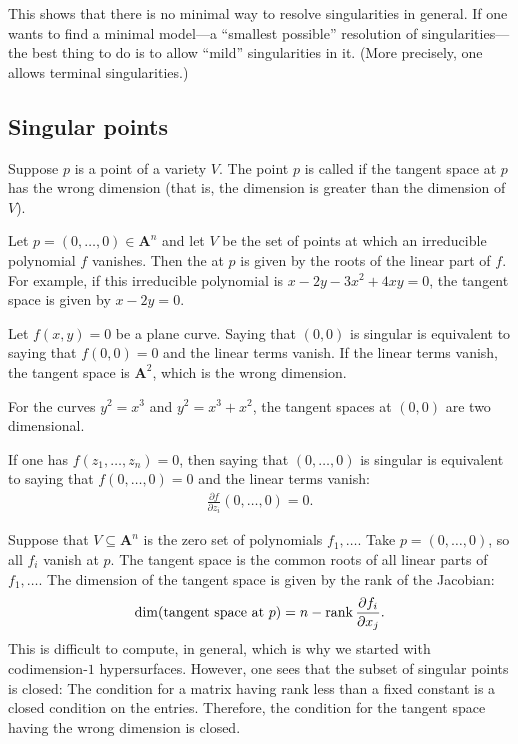 \documentclass [11 pt, oneside] {article}
\begin{document}
	This shows that there is no minimal way to resolve singularities in general. If one wants to find a minimal model---a ``smallest possible'' resolution of singularities---the best thing to do is to allow ``mild'' singularities in it. (More precisely, one allows terminal singularities.)

\subsection{Singular points}
Suppose $p$ is a point of a variety $V$. The point $p$ is called  if the tangent space at $p$ has the wrong dimension (that is, the dimension is greater than the dimension of $V$).

Let $p=(0,\hdots, 0)\in  \mathbf{A}^n$ and let $V$ be the set of points at which an irreducible polynomial $f$ vanishes. Then the  at $p$ is given by the roots of the linear part of $f$. For example, if this irreducible polynomial is $x-2y-3x^2+4xy =0$, the tangent space is given by $x-2y=0$.

Let $f(x,y)=0$ be a plane curve. Saying that $(0,0)$ is singular is equivalent to saying that $f(0,0)=0$ and the linear terms vanish. If the linear terms vanish, the tangent space is $\mathbf{A}^2$, which is the wrong dimension.

\begin{example}[ ]\label{}\text{}
For the curves $y^2 = x^3$ and $y^2 = x^3+x^2$, the tangent spaces at $(0,0)$ are two dimensional.
\end{example}

If one has $f(z_1,\hdots, z_n) =0$, then saying that $(0,\hdots, 0)$ is singular is equivalent to saying that $f(0,\hdots,0)=0$ and the linear terms vanish: 
\begin{align*}
	\frac{\partial f}{\partial z_i}(0,\hdots, 0) =0.
\end{align*}

Suppose that $V\subseteq \mathbf{A}^n$ is the zero set of polynomials $f_1,\hdots$. Take $p=(0,\hdots, 0)$, so all $f_i$ vanish at $p$. The tangent space is the common roots of all linear parts of $f_1,\hdots$. The dimension of the tangent space is given by the rank of the Jacobian:
\begin{align*}
	\dim(\textrm{tangent space at $p$}) = n-\operatorname{rank} \frac{\partial f_i}{\partial x_j}.
\end{align*}
This is difficult to compute, in general, which is why we started with codimension-$1$ hypersurfaces. However, one sees that the subset of singular points is closed: The condition for a matrix having rank less than a fixed constant is a closed condition on the entries. Therefore, the condition for the tangent space having the wrong dimension is closed.
\end{document}
